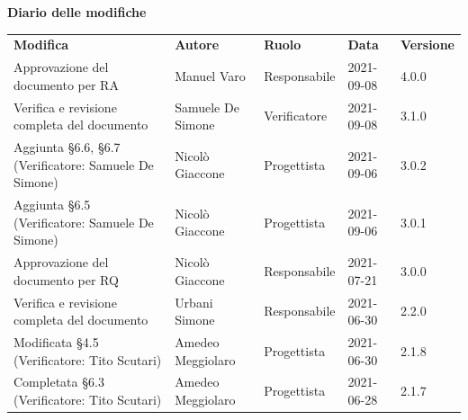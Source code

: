 \documentclass[a4paper]{article}
\begin{document}
\begin{center}
    \textbf{\Large Diario delle modifiche}\\
    \vspace{10px}
    \begin{table}[h!]
        \centering
        \renewcommand{\arraystretch}{1.8}
        \begin{tabular}{p{160px} p{90px} p{70px} p{55px} p{45px}}
            \rowcolor{logo!70} \textbf{Modifica}                          & \textbf{Autore}   & \textbf{Ruolo} & \textbf{Data} & \textbf{Versione} \\
            Approvazione del documento per RA                                                                       & Manuel Varo       & Responsabile   & 2021-09-08    & 4.0.0             \\
            Verifica e revisione completa del documento                                                             & Samuele De Simone & Verificatore   & 2021-09-08    & 3.1.0             \\
            Aggiunta \S 6.6, \S 6.7 \newline(Verificatore: Samuele De Simone)                                       & Nicolò Giaccone   & Progettista    & 2021-09-06    & 3.0.2             \\
            Aggiunta \S 6.5 \newline(Verificatore: Samuele De Simone)                                               & Nicolò Giaccone   & Progettista    & 2021-09-06    & 3.0.1             \\
            Approvazione del documento per RQ                                                                       & Nicolò Giaccone   & Responsabile   & 2021-07-21    & 3.0.0             \\
            Verifica e revisione completa del documento                                                             & Urbani Simone     & Responsabile   & 2021-06-30    & 2.2.0             \\
            Modificata \S 4.5 \newline(Verificatore: Tito Scutari)                                                  & Amedeo Meggiolaro & Progettista    & 2021-06-30    & 2.1.8             \\
            Completata \S 6.3 \newline(Verificatore: Tito Scutari)                                                  & Amedeo Meggiolaro & Progettista    & 2021-06-28    & 2.1.7             \\

\end{tabular}
\end{table}
\end{center}
\end{document}
